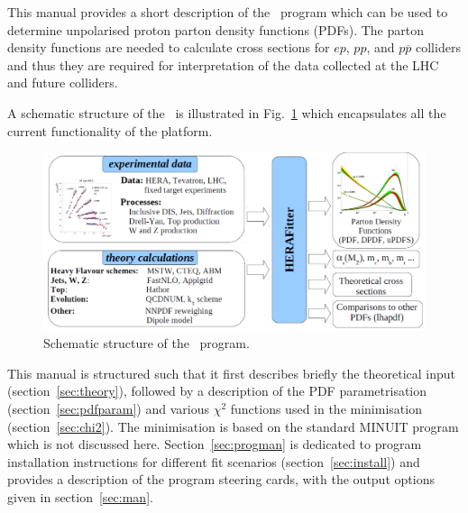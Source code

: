 \label{section:introduction}
This manual provides a short description of the \fitter\ program 
which can be used to determine unpolarised proton parton density functions 
(PDFs). 
The parton density functions are needed to calculate cross sections
for $ep$, $pp$, and $p\overline{p}$ colliders and thus they are required for interpretation
of the data collected at the LHC and future colliders.

A schematic structure of the \fitter\ is illustrated in Fig.~\ref{fig:flow} which encapsulates all the current functionality of the platform.
\begin{figure}[!ht]
\begin{center}
\includegraphics[width=0.75\linewidth]{figures/flow.pdf}
\caption{Schematic structure of the \fitter\ program.}
\end{center}
\label{fig:flow}
\end{figure}

This manual is structured such that it first describes briefly the
 theoretical input (section~\ref{sec:theory}), followed by a description of the
PDF parametrisation (section~\ref{sec:pdfparam}) and various $\chi^2$ functions used in the minimisation (section~\ref{sec:chi2}). The minimisation is based on the standard MINUIT program \cite{MINUIT} which is not discussed here.
Section~\ref{sec:progman} is dedicated to program installation instructions for different fit scenarios (section~\ref{sec:install}) and provides a description of the program steering cards, with the output options given in section~\ref{sec:man}.
